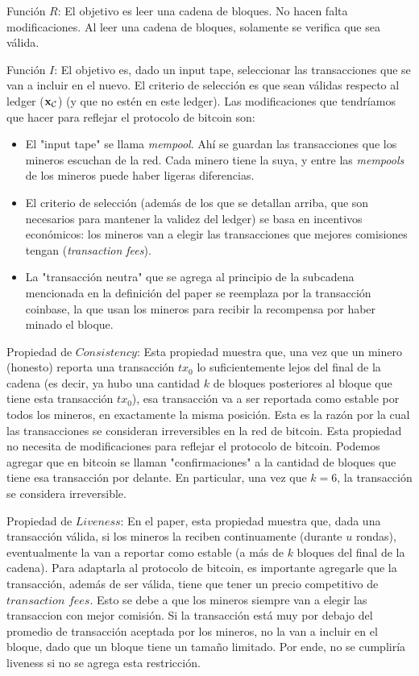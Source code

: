 \documentclass[12pt,addpoints,answers]{exam}
\begin{document}
\begin{questions}
\begin{parts}
\begin{solution}
        Función $R$: El objetivo es leer una cadena de bloques. No hacen falta modificaciones. Al leer una cadena de bloques, solamente se verifica que sea válida.
        
        Función $I$: El objetivo es, dado un input tape, seleccionar las transacciones que se van a incluir en el nuevo. El criterio de selección es que sean válidas respecto al ledger ($\bf{x}_{\mathcal{C}}$) (y que no estén en este ledger).
        Las modificaciones que tendríamos que hacer para reflejar el protocolo de bitcoin son:
        \begin{itemize}
            \item El "input tape" se llama \textit{mempool}. Ahí se guardan las transacciones que los mineros escuchan de la red. Cada minero tiene la suya, y entre las \textit{mempools} de los mineros puede haber ligeras diferencias.
            \item El criterio de selección (además de los que se detallan arriba, que son necesarios para mantener la validez del ledger) se basa en incentivos económicos: los mineros van a elegir las transacciones que mejores comisiones tengan (\textit{transaction fees}).
            \item La "transacción neutra" que se agrega al principio de la subcadena mencionada en la definición del paper se reemplaza por la transacción coinbase, la que usan los mineros para recibir la recompensa por haber minado el bloque.
        \end{itemize}

        Propiedad de $\textit{Consistency}$: Esta propiedad muestra que, una vez que un minero (honesto) reporta una transacción $tx_0$ lo suficientemente lejos del final de la cadena (es decir, ya hubo una cantidad $k$ de bloques posteriores al bloque que tiene esta transacción $tx_0$), esa transacción va a ser reportada como estable por todos los mineros, en exactamente la misma posición. Esta es la razón por la cual las transacciones se consideran irreversibles en la red de bitcoin.
        Esta propiedad no necesita de modificaciones para reflejar el protocolo de bitcoin. Podemos agregar que en bitcoin se llaman "confirmaciones" a la cantidad de bloques que tiene esa transacción por delante. En particular, una vez que $k=6$, la transacción se considera irreversible.

        Propiedad de $\textit{Liveness}$: En el paper, esta propiedad muestra que, dada una transacción válida, si los mineros la reciben continuamente (durante $u$ rondas), eventualmente la van a reportar como estable (a más de $k$ bloques del final de la cadena).
        Para adaptarla al protocolo de bitcoin, es importante agregarle que la transacción, además de ser válida, tiene que tener un precio competitivo de $\textit{transaction fees}$. Esto se debe a que los mineros siempre van a elegir las transaccion con mejor comisión. Si la transacción está muy por debajo del promedio de transacción aceptada por los mineros, no la van a incluir en el bloque, dado que un bloque tiene un tamaño limitado. 
        Por ende, no se cumpliría liveness si no se agrega esta restricción.


\end{solution}
\end{parts}
\end{questions}
\end{document}
